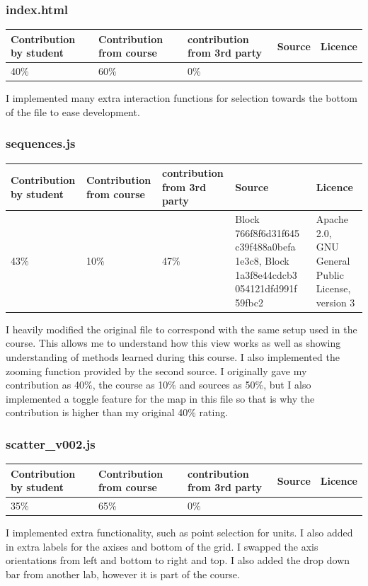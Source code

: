 \documentclass[a4paper, 11pt]{article}
\begin{document}
\subsubsection{index.html}
\begin{center}
 \begin{tabular}{||p{}|p{}|p{}|p{}|p{}||} 
 \hline
 Contribution by student & Contribution from course & contribution from 3rd party & Source & Licence 
 \\
 \hline
 40\% & 60\% & 0\% &  &
 \\
 \hline
\end{tabular}
\end{center}
I implemented many extra interaction functions for selection towards the bottom of the file to ease development.

\subsubsection{sequences.js}
\begin{center}
 \begin{tabular}{||p{}|p{}|p{}|p{}|p{}||} 
 \hline
 Contribution by student & Contribution from course & contribution from 3rd party & Source & Licence 
 \\
 \hline
 43\% & 10\% & 47\% & Block 766f8f6d31f645 c39f488a0befa 1e3c8, Block 1a3f8e44cdcb3 054121dfd991f 59fbc2 & Apache 2.0, GNU General Public License, version 3
 \\
 \hline
\end{tabular}
\end{center}
I heavily modified the original file to correspond with the same setup used in the course. This allows me to understand how this view works as well as showing understanding of methods learned during this course. I also implemented the zooming function provided by the second source. I originally gave my contribution as 40\%, the course as 10\% and sources as 50\%, but I also implemented a toggle feature for the map in this file so that is why the contribution is higher than my original 40\% rating.


\subsubsection{scatter\_v002.js}
\begin{center}
 \begin{tabular}{||p{}|p{}|p{}|p{}|p{}||} 
 \hline
 Contribution by student & Contribution from course & contribution from 3rd party & Source & Licence 
 \\
 \hline
 35\% & 65\% & 0\% & & 
 \\
 \hline
\end{tabular}
\end{center}
I implemented extra functionality, such as point selection for units. I also added in extra labels for the axises and bottom of the grid. I swapped the axis orientations from left and bottom to right and top. I also added the drop down bar from another lab, however it is part of the course.
\end{document}
